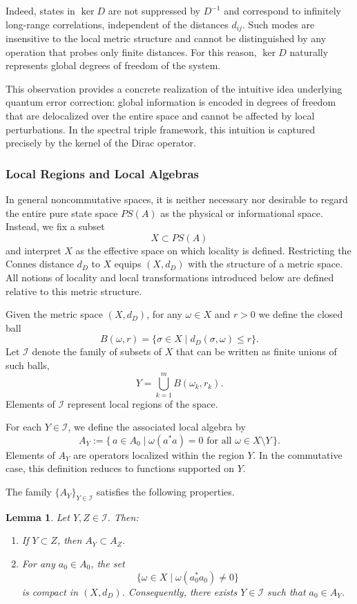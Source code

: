\documentclass[12pt]{article}
\theoremstyle{definition} %
\theoremstyle{plain} %
\newtheorem{lemma}[theorem]{Lemma}
\theoremstyle{remark} %
\theoremstyle{underline}
\begin{document}
Indeed, states in $\ker D$ are not suppressed by $D^{-1}$ and correspond to infinitely long-range correlations, independent of the distances $d_{ij}$. Such modes are insensitive to the local metric structure and cannot be distinguished by any operation that probes only finite distances. For this reason, $\ker D$ naturally represents global degrees of freedom of the system.

This observation provides a concrete realization of the intuitive idea underlying quantum error correction: global information is encoded in degrees of freedom that are delocalized over the entire space and cannot be affected by local perturbations. In the spectral triple framework, this intuition is captured precisely by the kernel of the Dirac operator.

\subsubsection{Local Regions and Local Algebras}

In general noncommutative spaces, it is neither necessary nor desirable to regard the entire pure state space $PS(A)$ as the physical or informational space. Instead, we fix a subset
\[
    X \subset PS(A)
\]
and interpret $X$ as the effective space on which locality is defined. Restricting the Connes distance $d_D$ to $X$ equips $(X,d_D)$ with the structure of a metric space.
All notions of locality and local transformations introduced below are defined relative to this metric structure.

Given the metric space $(X,d_D)$, for any $\omega\in X$ and $r>0$ we define the closed ball
\[
    B(\omega,r)=\{\sigma\in X \mid d_D(\sigma,\omega)\le r\}.
\]
Let $\mathcal{I}$ denote the family of subsets of $X$ that can be written as finite unions of such balls,
\[
    Y=\bigcup_{k=1}^m B(\omega_k,r_k).
\]
Elements of $\mathcal{I}$ represent local regions of the space.

For each $Y\in\mathcal{I}$, we define the associated local algebra by
\[
    A_Y
    :=\{\,a\in A_0 \mid \omega(a^*a)=0 \text{ for all } \omega\in X\setminus Y\,\}.
\]
Elements of $A_Y$ are operators localized within the region $Y$. In the commutative case, this definition reduces to functions supported on $Y$.

The family $\{A_Y\}_{Y\in\mathcal{I}}$ satisfies the following properties.

\begin{lemma}
    Let $Y,Z\in\mathcal{I}$. Then:
    \begin{enumerate}
        \item If $Y\subset Z$, then $A_Y \subset A_Z$.
        \item For any $a_0\in A_0$, the set
        \[
            \{\omega\in X \mid \omega(a_0^*a_0)\neq 0\}
        \]
        is compact in $(X,d_D)$. Consequently, there exists $Y\in\mathcal{I}$ such that $a_0\in A_Y$.
    \end{enumerate}
\end{lemma}
\end{document}

